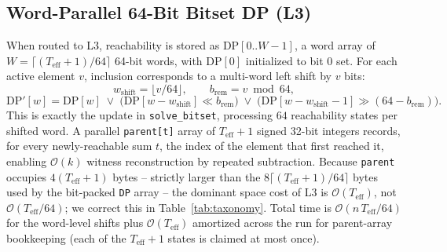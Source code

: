 \documentclass[journal,onecolumn,11pt]{IEEEtran}
\begin{document}
\subsection{Word-Parallel 64-Bit Bitset DP (L3)}
When routed to L3, reachability is stored as $\text{DP}[0..W{-}1]$, a word array of $W=\lceil (T_{\text{eff}}+1)/64\rceil$ 64-bit words, with $\text{DP}[0]$ initialized to bit $0$ set. For each active element $v$, inclusion corresponds to a multi-word left shift by $v$ bits:
\begin{equation}
    w_{\text{shift}} = \lfloor v/64\rfloor, \qquad b_{\text{rem}} = v \bmod 64,
\end{equation}
\begin{equation}
    \text{DP}'[w] = \text{DP}[w] \;\lor\; \big(\text{DP}[w-w_{\text{shift}}] \ll b_{\text{rem}}\big) \;\lor\; \big(\text{DP}[w-w_{\text{shift}}-1] \gg (64-b_{\text{rem}})\big).
    \label{eq:bitset_transition}
\end{equation}
This is exactly the update in \texttt{solve\_bitset}, processing $64$ reachability states per shifted word. A parallel \texttt{parent[t]} array of $T_{\text{eff}}{+}1$ signed 32-bit integers records, for every newly-reachable sum $t$, the index of the element that first reached it, enabling $\mathcal{O}(k)$ witness reconstruction by repeated subtraction. Because \texttt{parent} occupies $4(T_{\text{eff}}{+}1)$ bytes -- strictly larger than the $8\lceil (T_{\text{eff}}{+}1)/64\rceil$ bytes used by the bit-packed \texttt{DP} array -- the dominant space cost of L3 is $\mathcal{O}(T_{\text{eff}})$, not $\mathcal{O}(T_{\text{eff}}/64)$; we correct this in Table~\ref{tab:taxonomy}. Total time is $\mathcal{O}(n\,T_{\text{eff}}/64)$ for the word-level shifts plus $\mathcal{O}(T_{\text{eff}})$ amortized across the run for parent-array bookkeeping (each of the $T_{\text{eff}}{+}1$ states is claimed at most once).
\end{document}
